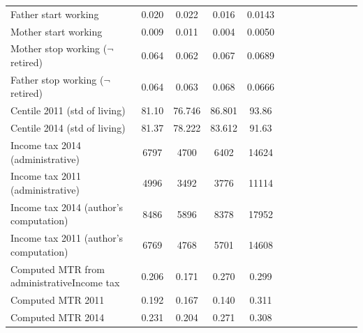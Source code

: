\begin{table}
{\begin{tabular}{lcccccccccccc}
    \midrule         
    Father start working	                  &    0.020          	& 0.022	     	&0.016                               	          	&0.0143                 \\        
    Mother start working	                  &    0.009          	& 0.011	     	&0.004                               	          	&0.0050                 \\ 
    \midrule        
    Mother stop working ($\neg$retired)	    & 0.064             	& 0.062	     	&0.067                               	          	&0.0689                 \\        
    Father stop working ($\neg$retired)	    & 0.064             	& 0.063	     	&0.068                               	          	&0.0666                 \\  
    \midrule       
    Centile 2011 (std of living)	          &    81.10          	& 76.746     	&86.801                              	          	&93.86               \\         
    Centile 2014	(std of living)           &    81.37          	& 78.222     	&83.612                              	          	&91.63               \\  
    \midrule       
    Income tax 2014	(administrative)        &   6797            	& 4700    	 	&6402                                   	      	&14624	                \\       
    Income tax 2011 (administrative)        &   4996              & 3492    	 	&3776                                   	      	&11114	                \\       
    Income tax 2014 (author's computation)  &   8486            	& 5896    	 	&8378                                   	      	&17952	                \\       
    Income tax 2011 (author's computation)  &   6769            	& 4768    	 	&5701                                   	      	&14608	                \\
    \midrule       
    Computed MTR from 
     administrativeIncome tax &   0.206   	& 0.171	     	&0.270                               	          	&0.299                  \\      
    Computed MTR 2011	                      &   0.192           	& 0.167	     	&0.140                               	          	&0.311                  \\      
    Computed MTR 2014                       &   0.231           	& 0.204	     	&0.271                               	          	&0.308                  \\ 

\end{tabular}}
\end{table}
